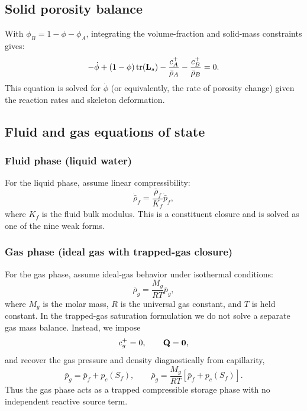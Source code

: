 \documentclass[11pt]{article}
\begin{document}
\subsection{Solid porosity balance}
With $\phi_B=1-\phi-\phi_A$, integrating the volume-fraction and solid-mass constraints gives:
\begin{equation}
-\dot\phi + (1-\phi)\,\mathrm{tr}(\mathbf{L}_s) - \frac{c_A^+}{\bar\rho_A}-\frac{c_B^+}{\bar\rho_B}=0.
\label{eq:solid_mass_phi}
\end{equation}
This equation is solved for $\dot\phi$ (or equivalently, the rate of porosity change) given the reaction rates and skeleton deformation.

\subsection{Fluid and gas equations of state}

\subsubsection{Fluid phase (liquid water)}
For the liquid phase, assume linear compressibility:
\begin{equation}
\dot{\bar\rho}_f=\frac{\bar\rho_f}{K_f}\dot{\bar p}_f,
\label{eq:fluid_eos}
\end{equation}
where $K_f$ is the fluid bulk modulus. This is a constituent closure and is solved as one of the nine weak forms.

\subsubsection{Gas phase (ideal gas with trapped-gas closure)}
For the gas phase, assume ideal-gas behavior under isothermal conditions:
\begin{equation}
\bar\rho_g = \frac{M_g}{RT}\bar p_g,
\label{eq:ideal_gas_eos_intrinsic}
\end{equation}
where $M_g$ is the molar mass, $R$ is the universal gas constant, and $T$ is held constant. In the trapped-gas saturation formulation we do not solve a separate gas mass balance. Instead, we impose
\begin{equation}
  c_g^+ = 0,
  \qquad
  \mathbf{Q} = \mathbf{0},
  \label{eq:trapped_gas_assumption}
\end{equation}
and recover the gas pressure and density diagnostically from capillarity,
\begin{equation}
  \bar p_g = \bar p_f + p_c(S_f),
  \qquad
  \bar\rho_g = \frac{M_g}{RT}\left[\bar p_f + p_c(S_f)\right].
  \label{eq:pg_rhog_from_pf_S}
\end{equation}
Thus the gas phase acts as a trapped compressible storage phase with no independent reactive source term.
\end{document}
